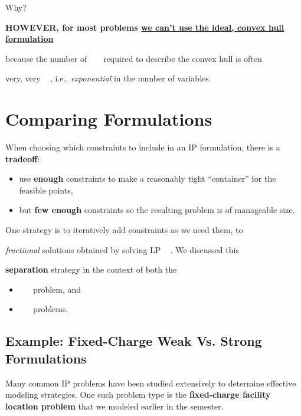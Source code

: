 \documentclass[11pt]{article}
\theoremstyle{definition}
\newcommand{\answerbox}[3]{%
  \fbox{%
    \begin{minipage}[#1]{#2}
      \hfill\vspace{#3}
    \end{minipage}
  }
}
\newcommand{\wordbox}{\answerbox{c}{1.2in}{.7cm}}
\begin{document}
Why?

\vspace{2cm}

\begin{tcolorbox}
\textbf{HOWEVER, for most problems \underline{we can't use the ideal, convex hull formulation}} 

because the number of ~\wordbox~ required to describe the convex hull is often 

very, very ~\wordbox, i.e., \emph{exponential} in the number of variables.
\end{tcolorbox}

\section{Comparing Formulations}

When choosing which constraints to include in an IP formulation, there is a \textbf{tradeoff}:
\begin{itemize}
	\item use \textbf{enough} constraints to make a reasonably tight ``container'' for the feasible points,
	\item but \textbf{few enough} constraints so the resulting problem is of manageable size.
\end{itemize}

One strategy is to iteratively add constraints as we need them, to ~\wordbox 

\emph{fractional} solutions obtained by solving LP ~\wordbox.  We discussed this

\textbf{separation} strategy in the context of both the 

\begin{itemize}
	\item \wordbox~\wordbox~ problem, and
	\item \wordbox~\wordbox~ problems.
\end{itemize}
\newpage
\subsection{Example:  Fixed-Charge Weak Vs. Strong Formulations}
Many common IP problems have been studied extensively to determine effective modeling strategies.  One such problem type is the \textbf{fixed-charge facility location problem} that we modeled earlier in the semester.  
\end{document}
